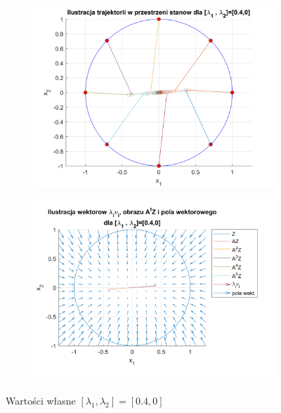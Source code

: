 \documentclass{article}
\begin{document}
\begin{figure}[H]
    \centering
    \begin{subfigure}{0.44\textwidth}
        \includegraphics[width=\textwidth]{portret_fazowy_4_0.png}
    \end{subfigure}
    \begin{subfigure}{0.48\textwidth}
        \includegraphics[width=\textwidth]{pole_wektorowe_4_0.png}
    \end{subfigure}
    \caption{Warto\'sci własne $[ \lambda_1, \lambda_2 ]= [ 0.4, 0 ]$}
    \label{fig::4i0}
\end{figure}
\end{document}
